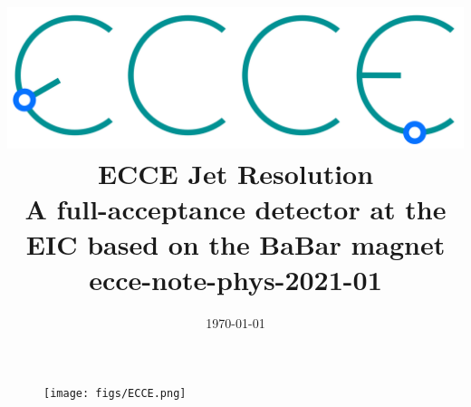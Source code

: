 \renewcommand*\familydefault{\sfdefault}
{\sffamily

\title{\includegraphics[width=0.3\linewidth]{figs/ecce-logo.png}\\ECCE Jet Resolution\\ \large A full-acceptance detector at the EIC based on the BaBar magnet\\ ecce-note-phys-2021-01}
\date{\today}
\maketitle


\begin{figure}[H]
  \begin{center}
    \texttt{[image: figs/ECCE.png]}
  \end{center}
\end{figure}
}


\renewcommand*\familydefault{\rmdefault}
